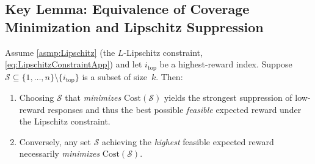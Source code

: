 \subsection{Key Lemma: Equivalence of Coverage Minimization and Lipschitz Suppression}

\begin{lemma}
\label{lem:appCoverageLemma}
Assume \ref{asmp:Lipschitz} (the \(L\)-Lipschitz constraint, \eqref{eq:LipschitzConstraintApp}) and let \(i_{\mathrm{top}}\) be a highest-reward index. Suppose \(\mathcal{S}\subseteq\{1,\dots,n\}\setminus\{i_{\mathrm{top}}\}\) is a subset of size~\(k\). Then:
\begin{enumerate}[label=(\roman*), leftmargin=1.25em, itemsep=0.5em]
    \item Choosing \(\mathcal{S}\) that \emph{minimizes} \(\mathrm{Cost}(\mathcal{S})\) yields the strongest suppression of low-reward responses and thus the best possible \emph{feasible} expected reward under the Lipschitz constraint.
    \item Conversely, any set \(\mathcal{S}\) achieving the \emph{highest} feasible expected reward necessarily \emph{minimizes} \(\mathrm{Cost}(\mathcal{S})\).
\end{enumerate}
\end{lemma}

